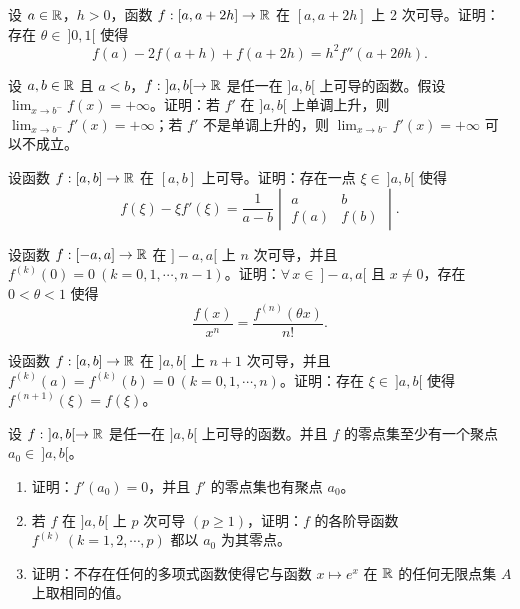 \begin{exercise}
	\item 设 \(a\in\mathbb{R}\)，\(h>0\)，函数 \(f:[a,a+2h]\to\mathbb{R}\) 在 \([a,a+2h]\) 上 2 次可导。证明：存在 \(\theta\in\ ]0,1[\) 使得
	\[
	f(a)-2f(a+h)+f(a+2h)=h^2f''(a+2\theta h).
	\]
\end{exercise}

\begin{exercise}
	\item 设 \(a,b\in\mathbb{R}\) 且 \(a<b\)，\(f:\ ]a,b[\to\mathbb{R}\) 是任一在 \(]a,b[\) 上可导的函数。假设 \(\lim_{x\to b^-}f(x)=+\infty\)。证明：若 \(f'\) 在 \(]a,b[\) 上单调上升，则 \(\lim_{x\to b^-}f'(x)=+\infty\)；若 \(f'\) 不是单调上升的，则 \(\lim_{x\to b^-}f'(x)=+\infty\) 可以不成立。
\end{exercise}

\begin{exercise}
	\item 设函数 \(f:[a,b]\to\mathbb{R}\) 在 \([a,b]\) 上可导。证明：存在一点 \(\xi\in\ ]a,b[\) 使得
	\[
	f(\xi)-\xi f'(\xi)=\frac1{a-b}\begin{vmatrix} a & b \\ f(a) & f(b) \end{vmatrix}.
	\]
\end{exercise}

\begin{exercise}
	\item 设函数 \(f:[-a,a]\to\mathbb{R}\) 在 \(]-a,a[\) 上 \(n\) 次可导，并且 \(f^{(k)}(0)=0\ (k=0,1,\cdots,n-1)\)。证明：\(\forall\,x\in\ ]-a,a[\) 且 \(x\neq0\)，存在 \(0<\theta<1\) 使得
	\[
	\frac{f(x)}{x^n}=\frac{f^{(n)}(\theta x)}{n!}.
	\]
\end{exercise}

\begin{exercise}
	\item 设函数 \(f:[a,b]\to\mathbb{R}\) 在 \(]a,b[\) 上 \(n+1\) 次可导，并且 \(f^{(k)}(a)=f^{(k)}(b)=0\ (k=0,1,\cdots,n)\)。证明：存在 \(\xi\in\ ]a,b[\) 使得 \(f^{(n+1)}(\xi)=f(\xi)\)。
\end{exercise}

\begin{exercise}
	\item 设 \(f:\ ]a,b[\to\mathbb{R}\) 是任一在 \(]a,b[\) 上可导的函数。并且 \(f\) 的零点集至少有一个聚点 \(a_0\in\ ]a,b[\)。
	\begin{enumerate}[label=\arabic*)]
		\item 证明：\(f'(a_0)=0\)，并且 \(f'\) 的零点集也有聚点 \(a_0\)。
		\item 若 \(f\) 在 \(]a,b[\) 上 \(p\) 次可导 \((p\ge1)\)，证明：\(f\) 的各阶导函数 \(f^{(k)}\ (k=1,2,\cdots,p)\) 都以 \(a_0\) 为其零点。
		\item 证明：不存在任何的多项式函数使得它与函数 \(x\longmapsto e^x\) 在 \(\mathbb{R}\) 的任何无限点集 \(A\) 上取相同的值。
	\end{enumerate}
\end{exercise}

